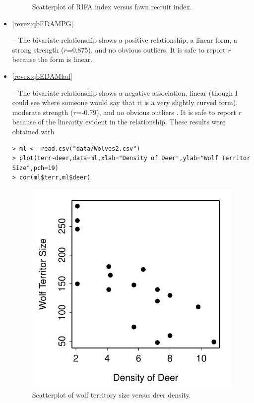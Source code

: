 \documentclass[10pt,openany]{book}\usepackage[]{graphicx}\usepackage[]{color}
\makeatletter
\newenvironment{kframe}{%
 \def\at@end@of@kframe{}%
 \ifinner\ifhmode%
  \def\at@end@of@kframe{\end{minipage}}%
  \begin{minipage}{\columnwidth}%
 \fi\fi%
 \def\FrameCommand##1{\hskip\@totalleftmargin \hskip-\fboxsep
 \colorbox{shadecolor}{##1}\hskip-\fboxsep
     \hskip-\linewidth \hskip-\@totalleftmargin \hskip\columnwidth}%
 \MakeFramed {\advance\hsize-\width
   \@totalleftmargin\z@ \linewidth\hsize
   \@setminipage}}%
 {\par\unskip\endMakeFramed%
 \at@end@of@kframe}
\newenvironment{knitrout}{}{} %
\makeatother
\begin{document}
\begin{itemize}
\begin{knitrout}
\begin{figure}[hbtp]
{}

\caption[Scatterplot of RIFA index versus fawn recruit index]{Scatterplot of RIFA index versus fawn recruit index.}\label{fig:ScatRIFA}
\end{figure}


\end{knitrout}

  \item \hypertarget{ans:qbEDAMPG}{\ref{revex:qbEDAMPG}} -- The bivariate relationship shows a positive relationship, a linear form, a strong strength ($r$=0.875), and no obvious outliers.  It is safe to report $r$ because the form is linear.


  \item \hypertarget{ans:qbEDAMlad}{\ref{revex:qbEDAMlad}} -- The bivariate relationship shows a negative association, linear (though I could see where someone would say that it is a very slightly curved form), moderate strength ($r$=-0.79), and no obvious outliers .  It is safe to report $r$ because of the linearity evident in the relationship.  These results were obtained with
\begin{knitrout}
\color{fgcolor}\begin{kframe}
\begin{verbatim}
> ml <- read.csv("data/Wolves2.csv")
> plot(terr~deer,data=ml,xlab="Density of Deer",ylab="Wolf Territor Size",pch=19)
> cor(ml$terr,ml$deer)
\end{verbatim}
\end{kframe}\begin{figure}[hbtp]

{\centering \includegraphics[width=.4\linewidth]{Figs/Wolves2Plot-1} 

}

\caption[Scatterplot of wolf territory size versus deer density]{Scatterplot of wolf territory size versus deer density.}\label{fig:Wolves2Plot}
\end{figure}



\end{knitrout}
\end{itemize}
\end{document}
